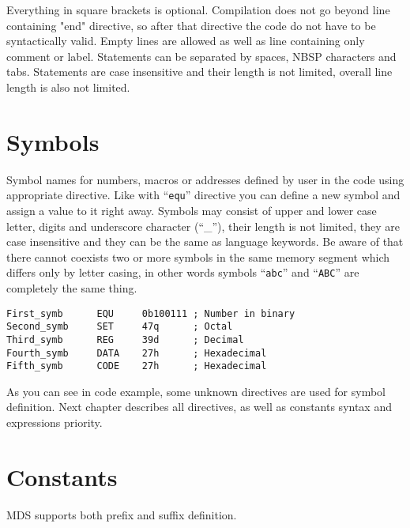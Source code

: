     Everything in square brackets is optional. Compilation does not go beyond line containing "end" directive, so after that directive the code do not have to be syntactically valid. Empty lines are allowed as well as line containing only comment or label. Statements can be separated by spaces, NBSP characters and tabs. Statements are case insensitive and their length is not limited, overall line length is also not limited.

\section{Symbols}
    Symbol names for numbers, macros or addresses defined by user in the code using appropriate directive. Like with ``\texttt{equ}'' directive you can define a new symbol and assign a value to it right away. Symbols may consist of upper and lower case letter, digits and underscore character (``\_''), their length is not limited, they are case insensitive and they can be the same as language keywords. Be aware of that there cannot coexists two or more symbols in the same memory segment which differs only by letter casing, in other words symbols ``\texttt{abc}'' and ``\texttt{ABC}'' are completely the same thing.

    {
        \usecodefont
        \verb'First_symb      EQU     0b100111 ; Number in binary'\\
        \verb'Second_symb     SET     47q      ; Octal'\\
        \verb'Third_symb      REG     39d      ; Decimal'\\
        \verb'Fourth_symb     DATA    27h      ; Hexadecimal'\\
        \verb'Fifth_symb      CODE    27h      ; Hexadecimal'
    }

    As you can see in code example, some unknown directives are used for symbol definition. Next chapter describes all directives, as well as constants syntax and expressions priority.

\section{Constants}
    MDS supports both prefix and suffix definition.

